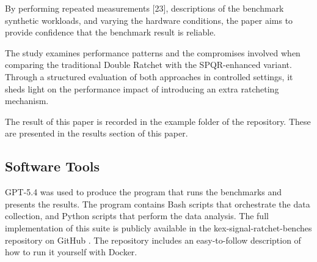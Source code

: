 By performing repeated measurements [23], descriptions of the benchmark synthetic workloads, and varying the hardware conditions, the paper aims to provide confidence that the benchmark result is reliable.

The study examines performance patterns and the compromises involved when comparing the traditional Double Ratchet with the SPQR-enhanced variant. Through a structured evaluation of both approaches in controlled settings, it sheds light on the performance impact of introducing an extra ratcheting mechanism.

The result of this paper is recorded in the example folder of the repository. These are presented in the results section of this paper.

\subsection{Software Tools}

 GPT-5.4 was used to produce the program that runs the benchmarks and presents the results. The program contains Bash scripts that orchestrate the data collection, and Python scripts that perform the data analysis. The full implementation of this suite is publicly available in the kex-signal-ratchet-benches repository on GitHub \cite{kexSignalRatchetBenches}. The repository includes an easy-to-follow description of how to run it yourself with Docker. 